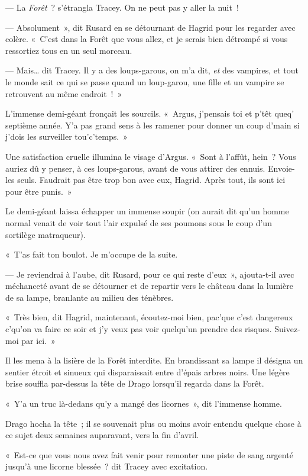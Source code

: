 --- La \emph{Forêt}~? s'étrangla Tracey. On ne peut pas y aller la nuit~!

--- Absolument~», dit Rusard en se détournant de Hagrid pour les regarder avec colère. «~C'est dans la Forêt que vous allez, et je serais bien détrompé si vous ressortiez tous en un seul morceau.

--- Mais… dit Tracey. Il y a des loups-garous, on m'a dit, \emph{et} des vampires, et tout le monde sait ce qui se passe quand un loup-garou, une fille et un vampire se retrouvent au même endroit~!~»

L'immense demi-géant fronçait les sourcils. «~Argus, j'pensais toi et p'têt queq' septième année. Y'a pas grand sens à les ramener pour donner un coup d'main si j'dois les surveiller tou'c'temps.~»

Une satisfaction cruelle illumina le visage d'Argus. «~Sont à l'affût, hein~? Vous auriez dû y penser, à ces loups-garous, avant de vous attirer des ennuis. Envoie-les seuls. Faudrait pas être trop bon avec eux, Hagrid. Après tout, ils sont ici pour être punis.~»

Le demi-géant laissa échapper un immense soupir (on aurait dit qu'un homme normal venait de voir tout l'air expulsé de ses poumons sous le coup d'un sortilège matraqueur).

«~T'as fait ton boulot. Je m'occupe de la suite.

--- Je reviendrai à l'aube, dit Rusard, pour ce qui reste d'eux~», ajouta-t-il avec méchanceté avant de se détourner et de repartir vers le château dans la lumière de sa lampe, branlante au milieu des ténèbres.

«~Très bien, dit Hagrid, maintenant, écoutez-moi bien, pac'que c'est dangereux c'qu'on va faire ce soir et j'y veux pas voir quelqu'un prendre des risques. Suivez-moi par ici.~»

Il les mena à la lisière de la Forêt interdite. En brandissant sa lampe il désigna un sentier étroit et sinueux qui disparaissait entre d'épais arbres noirs. Une légère brise souffla par-dessus la tête de Drago lorsqu'il regarda dans la Forêt.

«~Y'a un truc là-dedans qu'y a mangé des licornes~», dit l'immense homme.

Drago hocha la tête~; il se souvenait plus ou moins avoir entendu quelque chose à ce sujet deux semaines auparavant, vers la fin d'avril.

«~Est-ce que vous nous avez fait venir pour remonter une piste de sang argenté jusqu'à une licorne blessée~? dit Tracey avec excitation.

